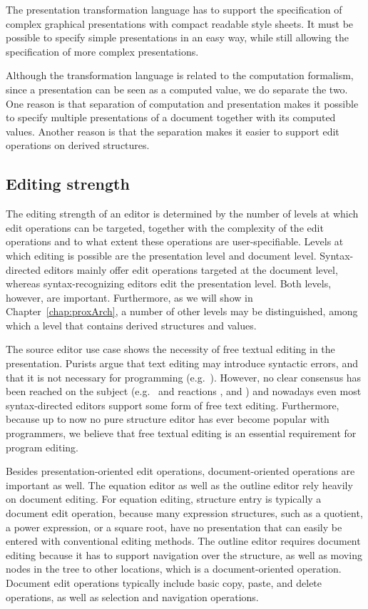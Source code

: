 The presentation transformation language has to support the specification of complex graphical presentations with compact readable style sheets. It must be possible to specify simple presentations in an easy way, while still allowing the specification of more complex presentations.

Although the transformation language is related to the computation formalism, since a presentation can be seen as a computed value, we do separate the two. One reason is that separation of computation and presentation makes it possible to specify multiple presentations of a document together with its computed values. Another reason is that the separation makes it easier to support edit operations on derived structures.


%																
\subsection{Editing strength}

The editing strength of an editor is determined by the number of levels at which edit operations can be targeted, together with the complexity of the edit operations and to what extent these operations are user-specifiable. Levels at which editing is possible are the presentation level and document level. Syntax-directed editors mainly offer edit operations targeted at the document level, whereas
syntax-recognizing editors edit the presentation level. Both levels, however, are important. Furthermore, as we will show in Chapter~\ref{chap:proxArch}, a number of other levels may be distinguished, among which a level that contains derived structures and values.

The source editor use case shows the necessity of free textual editing in the presentation. Purists argue that text editing may introduce syntactic errors, and that it is not necessary for programming (e.g.~\cite{teitelbaum81progSynth, magnusson90orm}). However, no clear consensus has been reached on the subject (e.g.~\cite{abandonText82waters} and reactions \cite{shani83notAbandon, responseToWaters83notkin}, and \cite{vanter94practical}) and nowadays even most syntax-directed editors support some form of free text editing. Furthermore, because up to now no pure structure editor has ever become popular with programmers, we believe that free textual editing is an essential requirement for program editing.

Besides presentation-oriented edit operations, document-oriented operations are important as well. The equation editor as well as the outline editor rely heavily on document editing. For equation editing, structure entry is typically a document edit operation, because many expression structures, such as a quotient, a power expression, or a square root, have no presentation that can easily be entered with conventional editing methods. The outline editor requires document editing because it has to support navigation over the structure, as well as moving nodes in the tree to other locations, which is a document-oriented operation. Document edit operations typically include basic copy, paste, and delete operations, as well as selection and navigation operations.

